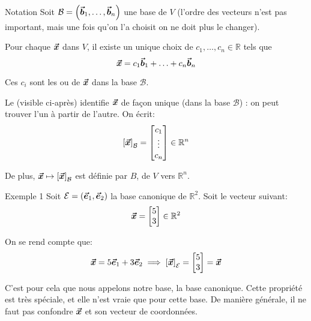 \documentclass[a4paper]{article}
\begin{document}
\begin{parag}{Notation}
    Soit $\mathcal{B} = \left(\bvec{b}_1, \ldots, \bvec{b}_n\right)$ une base de $V$ (l'ordre des vecteurs n'est pas important, mais une fois qu'on l'a choisit on ne doit plus le changer).

    Pour chaque $\bm{\protect\vec{x}}$ dans $V$, il existe un unique choix de $c_1, \ldots, c_n \in \mathbb{R}$ tels que
    \[\bm{\protect\vec{x}} = c_1 \bm{\protect\vec{b}}_1 + \ldots + c_n \bm{\protect\vec{b}}_n\]

    Ces $c_i$ sont les  ou  de $\bm{\protect\vec{x}}$ dans la base $\mathcal{B}$.

    Le  (visible ci-après) identifie $\bm{\protect\vec{x}}$ de façon unique (dans la base $\mathcal{B}$) : on peut trouver l'un à partir de l'autre. On écrit:
    \[\left[\bvec{x}\right]_{\mathcal{B}} = \begin{bmatrix} c_1 \\ \vdots \\ c_n \end{bmatrix} \in \mathbb{R}^{n}\]

    De plus, $\bvec{x} \mapsto \left[\bvec{x}\right]_{\mathcal{B}}$ est  définie par $B$, de $V$ vers $\mathbb{R}^{n}$.
\end{parag}

\begin{parag}{Exemple 1}
    Soit $\mathcal{E} = \left(\bvec{e}_1, \bvec{e}_2\right)$ la base canonique de $\mathbb{R}^2$. Soit le vecteur suivant:
    \[\bm{\protect\vec{x}} = \begin{bmatrix} 5 \\ 3 \end{bmatrix} \in \mathbb{R}^2\]

    On se rend compte que:
    \[\bvec{x} = 5\bvec{e}_1 + 3\bvec{e}_2 \implies \left[\bvec{x}\right]_{\mathcal{E}} = \begin{bmatrix} 5 \\ 3 \end{bmatrix} = \bvec{x}\]

    C'est pour cela que nous appelons notre base, la base canonique. Cette propriété est très spéciale, et elle n'est vraie que pour cette base. De manière générale, il ne faut pas confondre $\bm{\protect\vec{x}}$ et son vecteur de coordonnées.
\end{parag}
\end{document}
